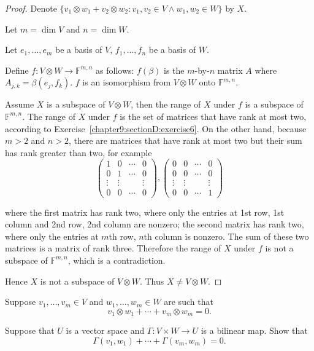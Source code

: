 \begin{proof}
    Denote $\{ v_{1}\otimes w_{1} + v_{2}\otimes w_{2}: v_{1}, v_{2}\in V \land w_{1}, w_{2}\in W \}$ by $X$.

    Let $m = \dim V$ and $n = \dim W$.

    Let $e_{1}, \ldots, e_{m}$ be a basis of $V$, $f_{1}, \ldots, f_{n}$ be a basis of $W$.

    Define $f: V\otimes W\to \mathbb{F}^{m,n}$ as follows: $f(\beta)$ is the $m$-by-$n$ matrix $A$ where $A_{j,k} = \beta(e_{j}, f_{k})$. $f$ is an isomorphism from $V\otimes W$ onto $\mathbb{F}^{m,n}$.

    Assume $X$ is a subspace of $V\otimes W$, then the range of $X$ under $f$ is a subspace of $\mathbb{F}^{m,n}$. The range of $X$ under $f$ is the set of matrices that have rank at most two, according to Exercise~\ref{chapter9:sectionD:exercise6}. On the other hand, because $m > 2$ and $n > 2$, there are matrices that have rank at most two but their sum has rank greater than two, for example
    \[
        \begin{pmatrix}
            1      & 0      & \cdots & 0      \\
            0      & 1      & \cdots & 0      \\
            \vdots & \vdots &        & \vdots \\
            0      & 0      & \cdots & 0
        \end{pmatrix},
        \begin{pmatrix}
            0      & 0      & \cdots & 0      \\
            0      & 0      & \cdots & 0      \\
            \vdots & \vdots &        & \vdots \\
            0      & 0      & \cdots & 1
        \end{pmatrix}
    \]

    where the first matrix has rank two, where only the entries at 1st row, 1st column and 2nd row, 2nd column are nonzero; the second matrix has rank two, where only the entries at $m$th row, $n$th column is nonzero. The sum of these two matrices is a matrix of rank three. Therefore the range of $X$ under $f$ is not a subspace of $\mathbb{F}^{m,n}$, which is a contradiction.

    Hence $X$ is not a subspace of $V\otimes W$. Thus $X\ne V\otimes W$.
\end{proof}
\newpage

\begin{exercise}\label{chapter9:sectionD:exercise8}
    Suppose $v_{1}, \ldots, v_{m}\in V$ and $w_{1}, \ldots, w_{m}\in W$ are such that
    \[
        v_{1}\otimes w_{1} + \cdots + v_{m}\otimes w_{m} = 0.
    \]

    Suppose that $U$ is a vector space and $\Gamma: V\times W\to U$ is a bilinear map. Show that
    \[
        \Gamma(v_{1}, w_{1}) + \cdots + \Gamma(v_{m}, w_{m}) = 0.
    \]
\end{exercise}

